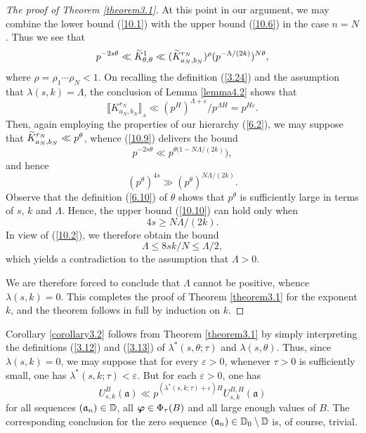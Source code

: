 \documentclass[12pt,reqno]{amsart}
\theoremstyle{definition}
\theoremstyle{remark}
\numberwithin{equation}{section}
\def\gra{{\mathfrak a}}\def\grA{{\mathfrak A}}\def\bfgra{{\boldsymbol \gra}}
\def\tet{{\theta}} \def\bftet{{\boldsymbol \theta}}
\def\lam{{\lambda}} \def\Lam{{\Lambda}} \def\Lamtil{{\widetilde \Lambda}}
\def\eps{\varepsilon}
\def\le{\leqslant} \def\ge{\geqslant} \def\pleq{\preccurlyeq} \def\ple{\prec}
\newcommand{\rrbracketsub}[1]{\rrbracket_{\textstyle{_#1}}}
\begin{document}
\begin{proof}[The proof of Theorem \ref{theorem3.1}]
At this point in our argument, we may combine the lower bound (\ref{10.1}) with the upper 
bound (\ref{10.6}) in the case $n=N$. Thus we see that
\begin{equation}\label{10.9}
p^{-2s\tet}\ll \Ktil_{\tet,\tet}^1\ll (\Ktil_{a_N,b_N}^{r_N})^\rho 
(p^{-\Lam /(2k)})^{N\tet},
\end{equation}
where $\rho=\rho_1\cdots \rho_N<1$. On recalling the definition (\ref{3.24}) and the 
assumption that $\lam(s,k)=\Lam$, the conclusion of Lemma \ref{lemma4.2} shows that
$$\llbracket K_{a_N,b_N}^{r_N}\rrbracketsub{\Lam} \ll (p^H)^{\Lam+\eps}/p^{\Lam H}
=p^{H\eps}.$$
Then, again employing the properties of our hierarchy (\ref{6.2}), we may suppose that 
$\Ktil_{a_N,b_N}^{r_N}\ll p^\tet$, whence (\ref{10.9}) delivers the bound
$$p^{-2s\tet}\ll p^{\tet (1-N\Lam/(2k)}),$$
and hence
\begin{equation}\label{10.10}
(p^\tet)^{4s}\gg (p^\tet)^{N\Lam /(2k)}.
\end{equation}
Observe that the definition (\ref{6.10}) of $\tet$ shows that $p^\tet$ is sufficiently large 
in terms of $s$, $k$ and $\Lam$. Hence, the upper bound (\ref{10.10}) can hold only when
$$4s\ge N\Lam/(2k).$$
In view of (\ref{10.2}), we therefore obtain the bound
$$\Lam\le 8sk/N\le \Lam/2,$$
which yields a contradiction to the assumption that $\Lam>0$.\par

We are therefore forced to conclude that $\Lam$ cannot be positive, whence 
$\lam(s,k)=0$. This completes the proof of Theorem \ref{theorem3.1} for the exponent 
$k$, and the theorem follows in full by induction on $k$.
\end{proof}

Corollary \ref{corollary3.2} follows from Theorem \ref{theorem3.1} by simply interpreting 
the definitions (\ref{3.12}) and (\ref{3.13}) of $\lam^*(s,\tet;\tau)$ and $\lam(s,\tet)$. 
Thus, since $\lam(s,k)=0$, we may suppose that for every $\eps>0$, whenever $\tau>0$ 
is sufficiently small, one has $\lam^*(s,k;\tau)<\eps$. But for each $\eps>0$, one has
$$U_{s,k}^B(\bfgra)\ll p^{(\lam^*(s,k;\tau)+\eps)H}U_{s,k}^{B,H}(\bfgra)$$
for all sequences $(\gra_n)\in \dbD$, all ${\boldsymbol \varphi}\in \Phi_\tau(B)$ and all large enough 
values of $B$. The corresponding conclusion for the zero sequence 
$(\gra_n)\in \dbD_0\setminus \dbD$ is, of course, trivial.\par
\end{document}
